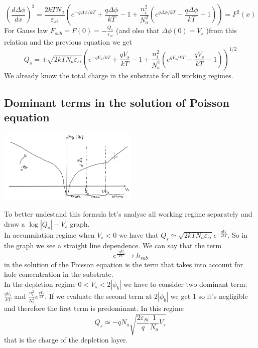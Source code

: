 \begin{equation}
(\frac{d\Delta \phi }{dx})^2=\frac{2kTN_a}{\varepsilon_{si}}\left(e^{-q\Delta \phi/kT}+\frac{q\Delta \phi}{kT}-1+\frac{n_i^2}{N_a^2}(e^{q\Delta \phi/kT}-\frac{q\Delta \phi}{kT}-1)\right)=F^2(x)
\end{equation}
For Gauss law $F_{sub}=F(0)=-\frac{Q_s}{\varepsilon_{si}}$ (and olso that $\Delta \phi (0)=V_s$ )from this relation and the previous equation we get
\begin{equation}
Q_s=\pm\sqrt{2kTN_a\varepsilon_{si}}\left(e^{-qV_s/kT}+\frac{qV_s}{kT}-1+\frac{n_i^2}{N_a^2}(e^{qV_s/kT}-\frac{qV_s}{kT}-1)\right)^{1/2}
\end{equation}
We already know the total charge in the substrate for all working regimes.\\
\subsection{Dominant terms in the solution of Poisson equation}
\centering
\includegraphics[width=0.5\textwidth]{logqVs.png}\\
\raggedright

To better undestand this formula let's analyse all working regime separately and draw a $\log |Q_s| - V_s$ graph.\\

\vspace{5mm}
In accumulation regime when $V_s<0$ we have that $Q_s\simeq \sqrt{2kTN_a\varepsilon_{si}}e^{-\frac{qV_s}{2kT}}$. So in the graph we see a straight line dependence. We can say that the term
\begin{equation}
e^{\frac{-qV_s}{kT}}\rightarrow h_{sub}
\end{equation} 
in the solution of the Poisson equation is the term that takes into account for hole concentration in the substrate.\\

\vspace{5mm}
In the depletion regime $0<V_s<2|\phi_b|$ we have to consider two dominant term: $\frac{qV_s}{kT}$ and $\frac{n_i^2}{N_a^2}e^{\frac{qV_s}{kT}}$. If we evaluate the second term at $2|\phi_b|$ we get 1 so it's negligible and therefore the first term is predominant. In this regime
\begin{equation}
Q_s\simeq -qN_a\sqrt{\frac{2\varepsilon_{Si}}{q}\frac{1}{N_a}V_s}
\end{equation}
that is the charge of the depletion layer.\\

